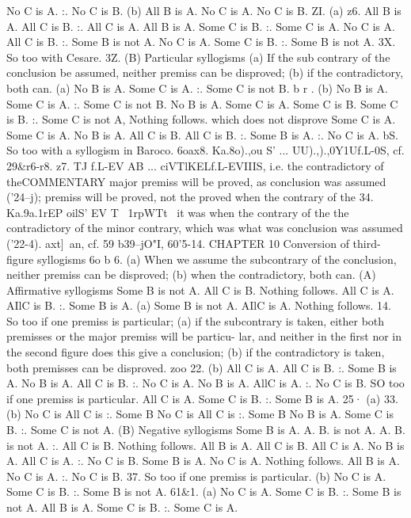 {{No C is A.
:. No C is B.
(b)
All B is A.
No C is A.
No C is B.
ZI. (a)
z6.
All B is A.
All C is B.
:. All C is A.
All B is A.
Some C is B.
:. Some C is A.
No C is A.
All C is B.
:. Some B is not A.
No C is A.
Some C is B.
:. Some B is not A.
3X. So too with Cesare.
3Z.
(B) Particular syllogisms
(a) If the sub contrary of the conclusion be assumed, neither
premiss can be disproved; (b) if the contradictory, both can.
(a) No B is A.
Some C is A.
:. Some C is not B.
b r . (b) No B is A.
Some C is A.
:. Some C is not B.
No B is A.
Some C is A.
Some C is B.
Some C is B.
:. Some C is not A,
Nothing follows.
which does not disprove
Some C is A.
Some C is A.
No B is A.
All C is B.
All C is B.
:. Some B is A.
:. No C is A.
bS. So too with a syllogism in Baroco.
6oax8. Ka.8o).,ou S' ... UU).,).,0Y1Uf.L-0S, cf. 29&r6-r8.
z7. TJ f.L-EV AB ... ciVTlKELf.L-EVIIIS, i.e. the contradictory of theCOMMENTARY
major premiss will be proved, as
conclusion was assumed ('24--{j);
premiss will be proved, not the
proved when the contrary of the
34. Ka.9a.1rEP oilS' EV T~ 1rpWTt~
it was when the contrary of the
the contradictory of the minor
contrary, which was what was
conclusion was assumed ('22-4).
axt]~an, cf. 59 b39--{jO"I, 60'5-14.
CHAPTER 10
Conversion of third-figure syllogisms
6o b 6. (a) When we assume the subcontrary of the conclusion,
neither premiss can be disproved; (b) when the contradictory,
both can.
(A) Affirmative syllogisms
Some B is not A.
All C is B.
Nothing follows.
All C is A.
AIlC is B.
:. Some B is A.
(a)
Some B is not A.
AIlC is A.
Nothing follows.
14. So too if one premiss is particular; (a) if the subcontrary is
taken, either both premisses or the major premiss will be particu-
lar, and neither in the first nor in the second figure does this give
a conclusion; (b) if the contradictory is taken, both premisses can
be disproved.
zoo
22.
(b)
All C is A.
All C is B.
:. Some B is A.
No B is A.
All C is B.
:. No C is A.
No B is A.
AllC is A.
:. No C is B.
SO too if one premiss is particular.
All C is A.
Some C is B.
:. Some B is A.
25·
(a)
33. (b)
No C is
All C is
:. Some B
No C is
All C is
:. Some B
No B is A.
Some C is B.
:. Some C is not A.
(B) Negative syllogisms
Some B is A.
A.
B.
is not A.
A.
B.
is not A. :.
All C is B.
Nothing follows.
All B is A.
All C is B.
All C is A.
No B is A.
All C is A.
:. No C is B.
Some B is A.
No C is A.
Nothing follows.
All B is A.
No C is A.
:. No C is B.
37. So too if one premiss is particular.
(b)
No C is A.
Some C is B.
:. Some B is not A.
61&1. (a)
No C is A.
Some C is B.
:. Some B is not A.
All B is A.
Some C is B.
:. Some C is A.
}}}}
